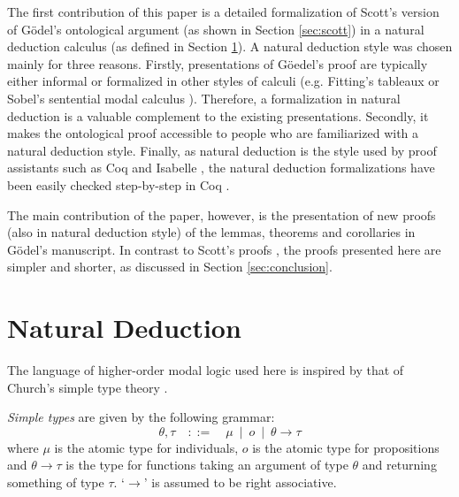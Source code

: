 \documentclass{llncs}
\newcommand{\imp}{\rightarrow}
\begin{document}
The first contribution of this paper is a detailed formalization of Scott's version \cite{Scott} of G\"odel's ontological argument \cite{Goedel} (as shown in Section \ref{sec:scott}) in a natural deduction calculus (as defined in Section \ref{sec:calculus}). A natural deduction style \citep{gentzen,prawitz} was chosen mainly for three reasons. Firstly, presentations of G\"oedel's proof are typically either informal or formalized in other styles of calculi (e.g. Fitting's tableaux \cite{fitting} or Sobel's sentential modal calculus \cite{sobel2}). Therefore, a formalization in natural deduction is a valuable complement to the existing presentations. Secondly, it makes the ontological proof accessible to people who are familiarized with a natural deduction style. Finally, as natural deduction is the style used by proof assistants such as Coq \cite{coq} and Isabelle \cite{isabelle}, the natural deduction formalizations have been easily checked step-by-step in Coq \cite{coqformalizations}.

The main contribution of the paper, however, is the presentation of new proofs (also in natural deduction style) of the lemmas, theorems and corollaries in G\"odel's manuscript. In contrast to Scott's proofs \cite{Scott}, the proofs presented here are simpler and shorter, as discussed in Section \ref{sec:conclusion}.



\section{Natural Deduction}
\label{sec:calculus}

The language of higher-order modal logic used here is inspired by that of Church's simple type theory \citep{church}.

\begin{definition} \emph{Simple types} are given by the following grammar:
$$
  \theta,\tau \quad ::= \quad \mu \ \mid \ o \ \mid \ \theta \imp \tau
$$
where $\mu$ is the atomic type for individuals, $o$ is the atomic type for propositions and $\theta \imp \tau$ is the type for functions taking an argument of type $\theta$ and returning something of type $\tau$. `$\imp$' is assumed to be right associative.
\end{definition}
\end{document}
